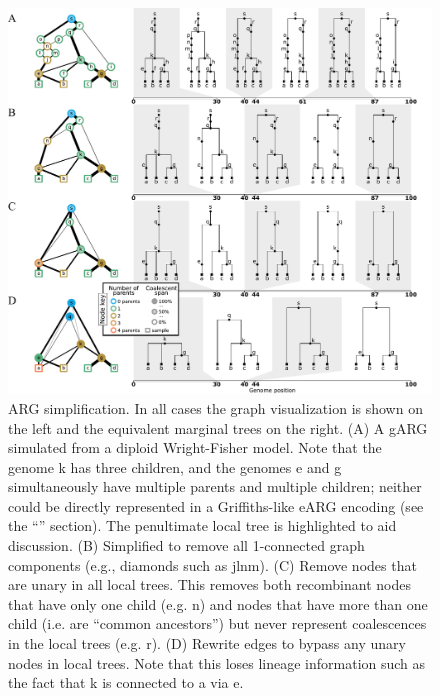 \documentclass{article}
\begin{document}
\begin{figure}
\centering
\vspace{5em}
\includegraphics[width=\linewidth]{illustrations/simplification}
\caption{\label{fig-simplification}
ARG simplification. In all cases the graph visualization is shown on the left
and the equivalent marginal trees on the right.
(A) A gARG simulated from a diploid Wright-Fisher
model. Note that the genome \textsf{k} has three children, and the genomes
\textsf{e} and \textsf{g} simultaneously have multiple parents and multiple children;
neither could be directly represented in a Griffiths-like eARG encoding
(see the ``'' section). The penultimate local tree is highlighted to aid discussion.
(B) Simplified to remove all
1-connected graph components (e.g., diamonds such as \textsf{jlnm}).
(C) Remove nodes that are unary in all local trees. This removes both recombinant nodes
that have only one child (e.g. \textsf{n}) and nodes that have more
than one child (i.e. are ``common ancestors'') but never represent coalescences
in the local trees (e.g. \textsf{r}).
(D) Rewrite edges to bypass any unary nodes in local trees. Note that this loses lineage
information such as the fact that \textsf{k} is connected to \textsf{a} via \textsf{e}.
}
\end{figure}

\end{document}
